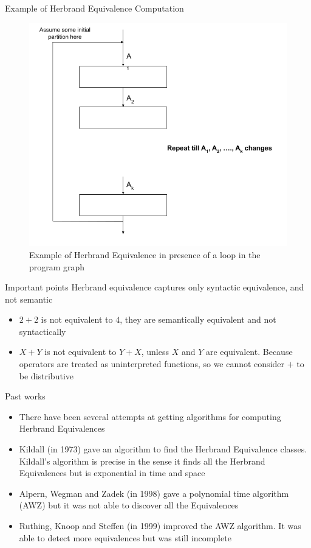 \documentclass[11pt]{beamer}
\begin{document}
\begin{frame}{Example of Herbrand Equivalence Computation}
    \begin{figure}[!h]
        \centering
        \includegraphics[scale=0.3]{HerbrandEquivalenceLoop.png}
        \caption{Example of Herbrand Equivalence in presence of a loop in the program graph}
        \label{fig:HerbrandEquivalenceLoop}
    \end{figure}
\end{frame}

\begin{frame}{Important points}
    Herbrand equivalence captures only syntactic equivalence, and not semantic
    \begin{itemize}
        \item $2 + 2$ is not equivalent to $4$, they are semantically equivalent and not syntactically 
        \item $X + Y$ is not equivalent to $Y + X$, unless $X$ and $Y$ are equivalent. Because operators are treated as uninterpreted functions, so we cannot consider $+$ to be distributive
    \end{itemize}
\end{frame}

\begin{frame}{Past works}
    \begin{itemize}
        \item There have been several attempts at getting algorithms for computing Herbrand Equivalences
        \item Kildall (in 1973) gave an algorithm to find the Herbrand Equivalence classes. Kildall's algorithm is precise in the sense it finds all the Herbrand Equivalences but is exponential in time and space
        \item Alpern, Wegman and Zadek (in 1998) gave a polynomial time algorithm (AWZ) but it was not able to discover all the Equivalences
        \item Ruthing, Knoop and Steffen (in 1999) improved the AWZ algorithm. It was able to detect more equivalences but was still incomplete
    \end{itemize}
\end{frame}
\end{document}
